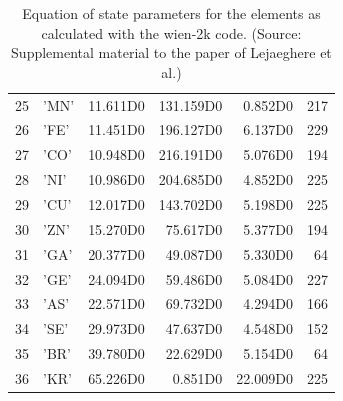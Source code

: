 \documentclass[11pt,a4paper]{report}
\begin{document}
\begin{table}[ht]
\begin{center}
\begin{tabular}{|r|l|r|r|r|r|}
 25 & 'MN'&    11.611D0&   131.159D0&     0.852D0&217 \\
 26 & 'FE'&    11.451D0&   196.127D0&     6.137D0&229 \\
 27 & 'CO'&    10.948D0&   216.191D0&     5.076D0&194 \\
 28 & 'NI'&    10.986D0&   204.685D0&     4.852D0&225 \\
 29 & 'CU'&    12.017D0&   143.702D0&     5.198D0&225 \\
 30 & 'ZN'&    15.270D0&    75.617D0&     5.377D0&194 \\
 31 & 'GA'&    20.377D0&    49.087D0&     5.330D0& 64 \\
 32 & 'GE'&    24.094D0&    59.486D0&     5.084D0&227 \\
 33 & 'AS'&    22.571D0&    69.732D0&     4.294D0&166 \\
 34 & 'SE'&    29.973D0&    47.637D0&     4.548D0&152 \\
 35 & 'BR'&    39.780D0&    22.629D0&     5.154D0& 64 \\
 36 & 'KR'&    65.226D0&     0.851D0&    22.009D0&225 \\
\hline
\end{tabular}
\end{center}
\caption{\label{tab:wieneqs_a}Equation of state parameters for the
  elements as calculated with the wien-2k code. (Source: Supplemental
  material to the paper of Lejaeghere et
  al.\cite{lejaeghere14_critrevsolstmatsci39_1}) }
\end{table}
\end{document}
